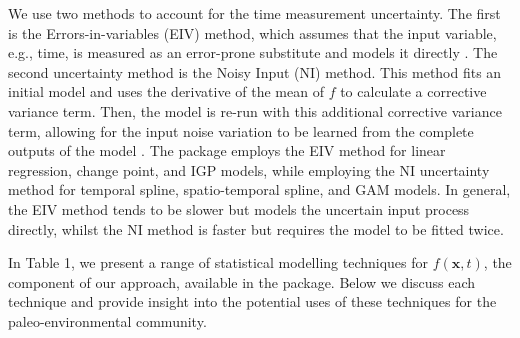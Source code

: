 We use two methods to account for the time measurement uncertainty. The first is the Errors-in-variables (EIV) method, which assumes that the input variable, e.g., time, is measured as an error-prone substitute and models it directly \citep{Dey2000}. The second uncertainty method is the Noisy Input (NI) method. This method fits an initial model and uses the derivative of the mean of \(f\) to calculate a corrective variance term. Then, the model is re-run with this additional corrective variance term, allowing for the input noise variation to be learned from the complete outputs of the model \citep{McHutchon2011}. The  package employs the EIV method for linear regression, change point, and IGP models, while employing the NI uncertainty method for temporal spline, spatio-temporal spline, and GAM models. In general, the EIV method tends to be slower but models the uncertain input process directly, whilst the NI method is faster but requires the model to be fitted twice.

In Table 1, we present a range of statistical modelling techniques for \(f(\mathbf{x},t)\), the component of our approach, available in the  package. Below we discuss each technique and provide insight into the potential uses of these techniques for the paleo-environmental community.

